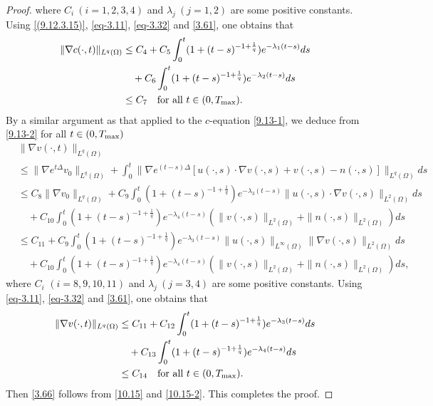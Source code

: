\documentclass[reqno]{amsart}
\begin{document}
\begin{proof}
where $ C_i \ (i = 1, 2, 3, 4) $ and $ \lambda_j \ (j = 1, 2) $ are some positive 
constants. Using \eqref{(9.12.3.15)}, \eqref{eq-3.11},
\eqref{eq-3.32} and \eqref{3.61}, one obtains that
\begin{equation}\label{10.15}
\begin{aligned}
\|\nabla c(\cdot, t)\|_{L^q(\Omega)} 
&\leq C_4 + C_5\int_{0}^t (1 + (t - s)^{-1 + \frac{1}{q}}) e^{-\lambda_1(t - s)} ds\\
&\quad + C_6 \int_{0}^t (1 + (t - s)^{-1 + \frac{1}{q} }) e^{-\lambda_2(t - s)} ds\\
&\leq C_7 \quad \text{for all } t \in (0, T_{\rm max}).
\end{aligned}
\end{equation}
By a similar argument as that applied to the $ c $-equation \eqref{9.13-1}, we deduce 
from \eqref{9.13-2} for all $t \in (0, T_{\rm max})$
\begin{align*}
&\|\nabla v(\cdot, t)\|_{L^q(\Omega)} \\&\leq \| \nabla e^{t\Delta} v_0\|_{L^q(\Omega)} 
 + \int_{0}^t \| \nabla e^{(t - s)\Delta} [ u(\cdot, s) \cdot
\nabla v(\cdot, s) + v(\cdot, s) - n(\cdot, s) ] \|_{L^q(\Omega)} ds \\
&\leq C_8\|\nabla v_0 \|_{L^q(\Omega)} + C_{9} \int_{0}^t
  (1 + (t - s)^{-1 + \frac{1}{q}}) e^{-\lambda_3(t - s)} \| u(\cdot, s) \cdot 
  \nabla v(\cdot,s) \|_{L^2(\Omega)} ds \\
&\quad + C_{10}  \int_{0}^t (1 + (t - s)^{-1 + \frac{1}{q}}) 
 e^{-\lambda_4(t - s)} ( \| v(\cdot, s) \|_{L^2(\Omega)} 
 + \| n(\cdot, s) \|_{L^2(\Omega)}) ds \\
&\leq C_{11} + C_{9} \int_{0}^t (1 + (t - s)^{-1 + \frac{1}{q}}) e^{-\lambda_3(t - s)} 
 \| u(\cdot, s) \|_{L^\infty(\Omega)}\| \nabla v(\cdot, s) \|_{L^2(\Omega)} ds\\
&\quad + C_{10} \int_{0}^t (1 + (t - s)^{-1 + \frac{1}{q}}) e^{-\lambda_4(t - s)}
 ( \| v(\cdot, s) \|_{L^2(\Omega)} + \| n(\cdot, s) \|_{L^2(\Omega)})ds ,
\end{align*}
where $ C_i$ $(i =8, 9, 10, 11) $ and $ \lambda_j \ (j = 3, 4) $ are some positive 
constants. Using \eqref{eq-3.11},
\eqref{eq-3.32} and \eqref{3.61}, one obtains that
\begin{equation}\label{10.15-2}
\begin{aligned}
\|\nabla v(\cdot, t)\|_{L^q(\Omega)}
& \leq C_{11} + C_{12}\int_0^t (1 + (t - s)^{-1 + \frac{1}{q}}) e^{-\lambda_3(t - s)} ds\\
&\quad + C_{13}\int_0^t (1 + (t - s)^{-1 + \frac{1}{q} }) e^{-\lambda_4(t - s)} ds \\
&\leq C_{14} \quad \text{for all } t \in (0, T_{\rm max}).
\end{aligned}
\end{equation}
Then \eqref{3.66}  follows from \eqref{10.15} and \eqref{10.15-2}. 
This completes the proof.
\end{proof}
\end{document}

